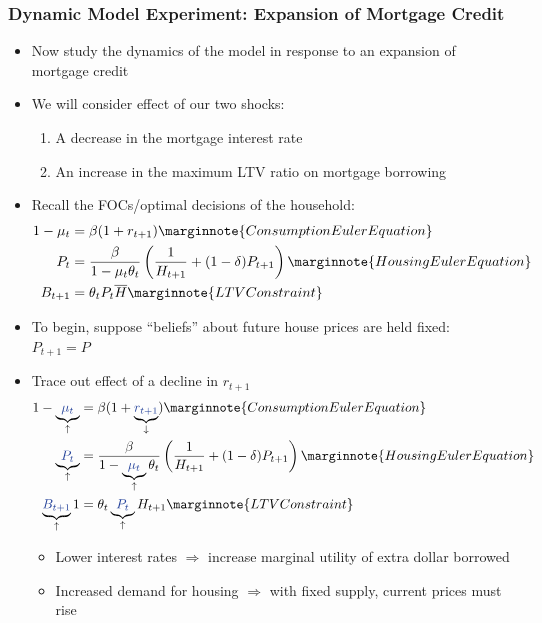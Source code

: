 \documentclass{article}
\numberwithin{equation}{section}
\numberwithin{figure}{section}
\begin{document}
\subsubsection{Dynamic Model Experiment: Expansion of Mortgage Credit}
	\begin{itemize}
		\item Now study the \textcolor{myblue}{dynamics} of the model in response to an expansion of mortgage credit
		\item We will consider effect of our two shocks:
		\begin{enumerate}[label=\textbf{\arabic*.}]
			\item A decrease in the mortgage interest rate
			\item An increase in the maximum LTV ratio on mortgage borrowing
		\end{enumerate}
		\item Recall the FOCs/optimal decisions of the household:
		\begin{align*}
			1-\mu_t&=\beta(1+r_{t+1}) \marginnote{Consumption Euler Equation}\\
			P_t&=\frac{\beta}{1-\mu_t\theta_t}\left( \frac{1}{H_{t+1}} + (1-\delta)P_{t+1} \right) \marginnote{Housing Euler Equation}\\
			B_{t+1}&=\theta_tP_t\overline{H} \marginnote{LTV Constraint}
		\end{align*}
		\item To begin, suppose ``beliefs'' about future house prices are held fixed: \( P_{t+1} = P \)
		\item Trace out effect of a decline in \textcolor{myblue}{\( r_{t+1} \)}
		\begin{align*}
			1-\underbrace{\textcolor{myblue}{\mu_t}}_\uparrow&=\beta(1+\underbrace{\textcolor{myblue}{r_{t+1}}}_\downarrow) \marginnote{Consumption Euler Equation}\\
			\underbrace{\textcolor{myblue}{P_t}}_\uparrow&=\frac{\beta}{1-\underbrace{\textcolor{myblue}{\mu_t}}_\uparrow\theta_t}\left( \frac{1}{H_{t+1}} + (1-\delta)P_{t+1} \right) \marginnote{Housing Euler Equation}\\
			\underbrace{\textcolor{myblue}{B_{t+1}}}_\uparrow1&=\theta_t\underbrace{\textcolor{myblue}{P_t}}_\uparrow H_{t+1} \marginnote{LTV Constraint}
		\end{align*}
		\begin{itemize}
			\item Lower interest rates \( \Rightarrow \) increase marginal utility of extra dollar borrowed
			\item Increased demand for housing \( \Rightarrow \) with fixed supply, current prices must rise

\end{itemize}
\end{itemize}
\end{document}
